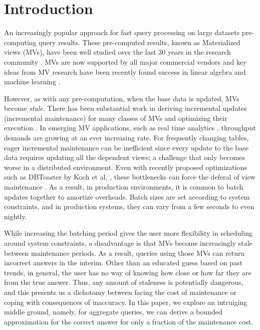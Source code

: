 \vspace{-0.5em}
\section{Introduction}
An increasingly popular approach for fast query processing on large datasets pre-computing query results.
These pre-computed results, known as Materialized views (MVs), have been well studied over the last 30 years in the
research community \cite{LarsonY85, gupta1995maintenance, chirkova2011materialized}.
MVs are now supported by all major commercial vendors and key ideas from MV research have been recently found success in linear algebra and machine learning \cite{nikolic2014linview, zhang2014mat}.

However, as with any pre-computation, when the base data is updated, MVs become \emph{stale}. 
There has been substantial work in deriving incremental updates (incremental maintenance) for many classes of MVs and optimizing their execution \cite{chirkova2011materialized, DBLP:journals/vldb/KochAKNNLS14}.
In emerging MV applications, such as real time analytics \cite{rainbird}, throughput demands are growing at an ever increasing rate.
For frequently changing tables, eager incremental maintenance can be inefficient since every update to the base data requires updating all the dependent views; a challenge that only becomes worse in a distributed environment.
Even with recently proposed optimizations such as DBToaster by Koch et al. \cite{DBLP:journals/vldb/KochAKNNLS14}, these bottlenecks can force the deferal of view
maintenance \cite{chirkova2011materialized, zhou2007lazy, DBLP:conf/sigmod/ColbyGLMT96}.
As a result, in production environments, it is common to batch updates together to amortize overheads.
Batch sizes are set according to system constraints, and in production systems, they can vary from a few seconds to even nightly.  

While increasing the batching period gives the user more flexibility in scheduling around system constraints, a disadvantage is that MVs become increasingly stale between maintenance periods.
As a result, queries using those MVs can return incorrect answers in the interim.
Other than an educated guess based on past trends, in general, the user has no way of knowing how close or how far they are from the true answer.
Thus, any amount of staleness is potentially dangerous, and this presents us a dichotomy between facing the cost of maintenance or coping with consequences of inaccuracy.
In this paper, we explore an intruiging middle ground, namely, for aggregate queries, we can derive a bounded approximation for the correct answer for only a fraction of the maintenance cost. 

